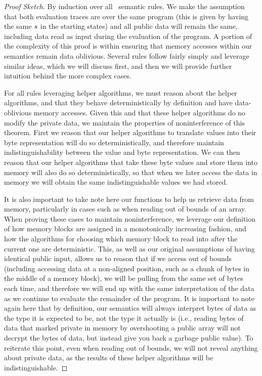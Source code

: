 \begin{proof}[Proof Sketch]
By induction over all \piccoC\ semantic rules. We make the assumption that both evaluation traces are over the same program (this is given by having the same $s$ in the starting states) and all public data will remain the same, including data read as input during the evaluation of the program. A portion of the complexity of this proof is within ensuring that memory accesses within our semantics remain data oblivious. 
Several rules follow fairly simply and leverage similar ideas, which we will discuss first, and then we will provide further intuition behind the more complex cases. 

For all rules leveraging helper algorithms, we must reason about the helper algorithms, and that they behave deterministically by definition and have data-oblivious memory accesses. Given this and that these helper algorithms do no modify the private data, we maintain the properties of noninterference of this theorem. First we reason that our helper algorithms to translate values into their byte representation will do so deterministically, and therefore maintain indistinguishability between the value and byte representation. We can then reason that our helper algorithms that take these byte values and store them into memory will also do so deterministically, so that when we later access the data in memory we will obtain the same indistinguishable values we had stored. 

It is also important to take note here our functions to help us retrieve data from memory, particularly in cases such as when reading out of bounds of an array. When proving these cases to maintain noninterference, we leverage our definition of how memory blocks are assigned in a monotonically increasing fashion, and how the algorithms for choosing which memory block to read into after the current one are deterministic. This, as well as our original assumptions of having identical public input, allows us to reason that if we access out of bounds (including accessing data at a non-aligned position, such as a chunk of bytes in the middle of a memory block), we will be pulling from the same set of bytes each time, and therefore we will end up with the same interpretation of the data as we continue to evaluate the remainder of the program. It is important to note again here that by definition, our semantics will always interpret bytes of data as the type it is expected to be, not the type it actually is (i.e., reading bytes of data that marked private in memory by overshooting a public array will not decrypt the bytes of data, but instead give you back a garbage public value). To reiterate this point, even when reading out of bounds, we will not reveal anything about private data, as the results of these helper algorithms will be indistinguishable.


\end{proof}
